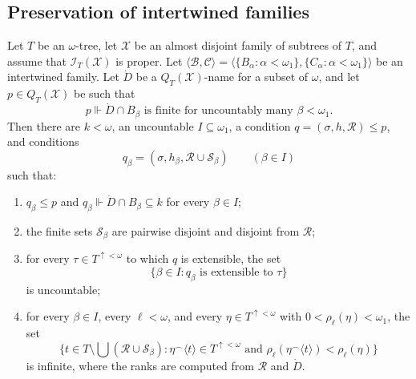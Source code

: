 \subsection{Preservation of intertwined families}
\label{subsec:preservation-intertwined}


\begin{lemma}\label{lem:QT-preservation-reduction}
Let $T$ be an $\omega$-tree, let $\mathcal X$ be an almost disjoint family of
subtrees of $T$, and assume that $\mathcal I_T(\mathcal X)$ is proper.  Let
$\langle\mathcal B,\mathcal C\rangle=\langle\{B_\alpha:\alpha<\omega_1\},
\{C_\alpha:\alpha<\omega_1\}\rangle$
be an intertwined family.  Let $\dot D$ be a $Q_T(\mathcal X)$-name for a
subset of $\omega$, and let $p\in Q_T(\mathcal X)$ be such that
\[
  p\Vdash \dot D\cap B_\beta\text{ is finite for uncountably many }\beta<\omega_1.
\]
Then there are $k<\omega$, an uncountable $I\subseteq\omega_1$, a condition
$q=(\sigma,h,\mathcal R)\leq p$, and conditions
\[
  q_\beta=(\sigma,h_\beta,\mathcal R\cup\mathcal S_\beta)
  \qquad(\beta\in I)
\]
such that:
\begin{enumerate}[label=(\alph*)]
    \item $q_\beta\leq p$ and
    $q_\beta\Vdash \dot D\cap B_\beta\subseteq k$ for every $\beta\in I$;
    \item the finite sets $\mathcal S_\beta$ are pairwise disjoint and
    disjoint from $\mathcal R$;
    \item for every $\tau\in T^{\uparrow<\omega}$ to which $q$ is extensible,
    the set
    \[
      \{\beta\in I:q_\beta\text{ is extensible to }\tau\}
    \]
    is uncountable;
    \item for every $\beta\in I$, every $\ell<\omega$, and every
    $\eta\in T^{\uparrow<\omega}$ with $0<\rho_\ell(\eta)<\omega_1$, the set
    \[
      \{t\in T\setminus\bigcup(\mathcal R\cup\mathcal S_\beta):
        \eta^\frown\langle t\rangle\in T^{\uparrow<\omega}
        \text{ and }
        \rho_\ell(\eta^\frown\langle t\rangle)<\rho_\ell(\eta)
      \}
    \]
    is infinite, where the ranks are computed from $\mathcal R$ and $\dot D$.
\end{enumerate}
\end{lemma}


